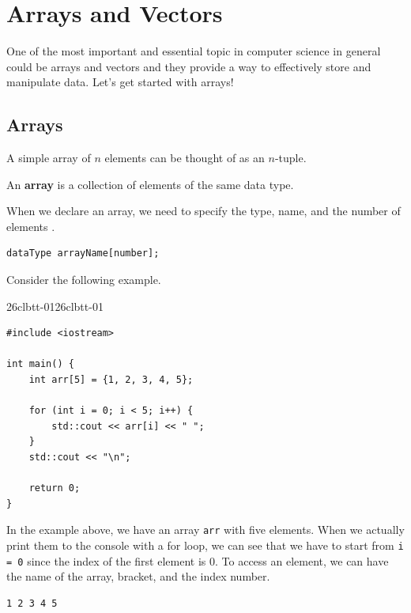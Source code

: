 \documentclass[../../../main.tex]{subfiles}
\begin{document}
\section{Arrays and Vectors}

One of the most important and essential topic in computer science
in general could be arrays and vectors and they provide a way
to effectively store and manipulate data. Let's get started with
arrays!

\subsection{Arrays}

A simple array of $n$ elements can be thought of as an $n$-tuple.

\begin{definition}{}{}
An \textbf{array} is a collection of elements of the same
data type.
\end{definition}

When we declare an array, we need to specify the type, name, and
the number of elements \cite{CS02-4}.

\begin{basicbox}
\begin{lstlisting}[style=basic]
dataType arrayName[number];
\end{lstlisting}
\end{basicbox}

Consider the following example.

\begin{cppbox}{26clbtt-01}{26clbtt-01}
\begin{lstlisting}[style=cppstyle]
#include <iostream>

int main() {
    int arr[5] = {1, 2, 3, 4, 5};

    for (int i = 0; i < 5; i++) {
        std::cout << arr[i] << " ";
    }
    std::cout << "\n";

    return 0;
}
\end{lstlisting}
\end{cppbox}

In the example above, we have an array \verb|arr| with five elements.
When we actually print them to the console with a for loop, we can
see that we have to start from \verb|i = 0| since the index of the
first element is $0$. To access an element, we can have the name
of the array, bracket, and the index number.

\begin{outputbox}
\begin{lstlisting}[style=basic]
1 2 3 4 5
\end{lstlisting}
\end{outputbox}
\end{document}

